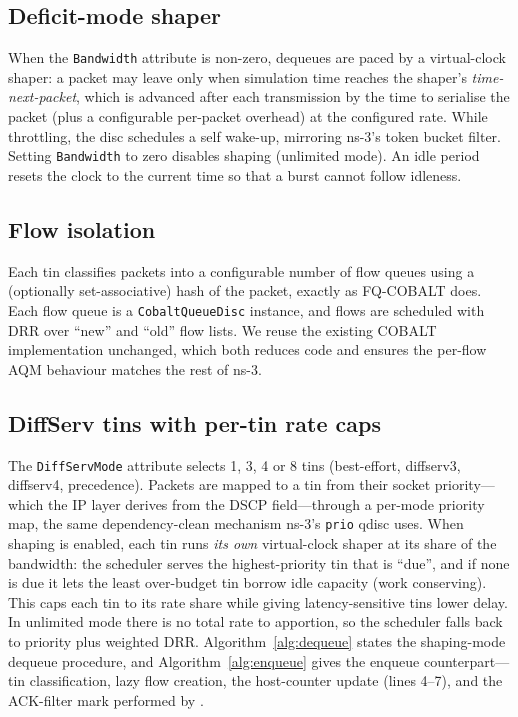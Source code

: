 \documentclass[sigconf,nonacm]{acmart}
\begin{document}
\subsection{Deficit-mode shaper}
When the \texttt{Bandwidth} attribute is non-zero, dequeues are paced by a
virtual-clock shaper: a packet may leave only when simulation time reaches the
shaper's \emph{time-next-packet}, which is advanced after each transmission by
the time to serialise the packet (plus a configurable per-packet overhead) at
the configured rate. While throttling, the disc schedules a self wake-up,
mirroring ns-3's token bucket filter. Setting \texttt{Bandwidth} to zero
disables shaping (unlimited mode). An idle period resets the clock to the
current time so that a burst cannot follow idleness.

\subsection{Flow isolation}
Each tin classifies packets into a configurable number of flow queues using a
(optionally set-associative) hash of the packet, exactly as FQ-COBALT does.
Each flow queue is a \texttt{CobaltQueueDisc} instance, and flows are scheduled
with DRR over ``new'' and ``old'' flow lists. We reuse the existing COBALT
implementation unchanged, which both reduces code and ensures the per-flow AQM
behaviour matches the rest of ns-3.

\subsection{DiffServ tins with per-tin rate caps}
\label{sec:tins}
The \texttt{DiffServMode} attribute selects 1, 3, 4 or 8 tins (best-effort,
diffserv3, diffserv4, precedence). Packets are mapped to a tin from their
socket priority---which the IP layer derives from the DSCP field---through a
per-mode priority map, the same dependency-clean mechanism ns-3's \texttt{prio}
qdisc uses. When shaping is enabled, each tin runs \emph{its own} virtual-clock
shaper at its share of the bandwidth: the scheduler serves the highest-priority
tin that is ``due'', and if none is due it lets the least over-budget tin borrow
idle capacity (work conserving). This caps each tin to its rate share while
giving latency-sensitive tins lower delay. In unlimited mode there is no total
rate to apportion, so the scheduler falls back to priority plus weighted DRR.
Algorithm~\ref{alg:dequeue} states the shaping-mode dequeue procedure, and
Algorithm~\ref{alg:enqueue} gives the enqueue counterpart---tin classification,
lazy flow creation, the host-counter update (lines 4--7), and the ACK-filter
mark performed by .
\end{document}
